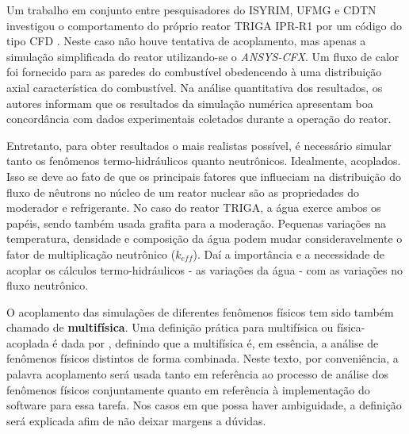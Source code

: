 \documentclass[12pt,openright,twoside,a4paper,english,french,spanish,brazil]{abntex2}
\begin{document}
Um trabalho em conjunto entre pesquisadores do ISYRIM, UFMG e CDTN investigou o 
comportamento do próprio reator TRIGA IPR-R1 por um código do tipo CFD \cite{Martinez2012}. 
Neste caso não houve tentativa de acoplamento, mas apenas a simulação simplificada 
do reator utilizando-se o \textit{ANSYS-CFX}. Um fluxo de calor 
foi fornecido para as paredes do combustível obedencendo à uma distribuição axial 
característica do combustível. Na análise quantitativa dos resultados, os autores 
informam que os resultados da simulação numérica apresentam boa concordância com 
dados experimentais coletados durante a operação do reator.


Entretanto, para obter resultados o mais realistas possível, é necessário simular 
tanto os fenômenos termo-hidráulicos quanto neutrônicos. Idealmente, acoplados. Isso 
se deve ao fato de que os principais fatores que influeciam na distribuição do fluxo de 
nêutrons no núcleo de um reator nuclear são as propriedades do moderador e refrigerante. No caso do 
reator TRIGA, a água exerce ambos os papéis, sendo também usada grafita para 
a moderação. Pequenas variações na temperatura, densidade e composição 
da água podem mudar consideravelmente o fator de multiplicação neutrônico ($k_{eff}$). Daí a importância e 
a necessidade de acoplar os cálculos termo-hidráulicos - as variações da água - com as variações 
no fluxo neutrônico.

O acoplamento das simulações de diferentes fenômenos físicos tem sido também chamado de \textbf{multifísica}. 
Uma definição prática para multifísica ou física-acoplada é dada por \cite{Lethbridge2005}, definindo que 
a multifísica é, em essência, a análise de fenômenos físicos distintos de forma combinada. Neste texto, 
por conveniência, a palavra acoplamento será usada tanto em referência ao processo de análise dos fenômenos físicos conjuntamente 
quanto em referência à implementação do software para essa tarefa. Nos casos em que possa haver ambiguidade, 
a definição será explicada afim de não deixar margens a dúvidas.
\end{document}

